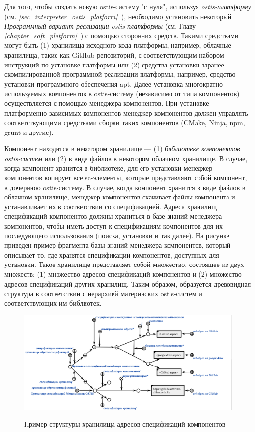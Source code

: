 Для того, чтобы создать новую ostis-систему "с нуля"{}, используя \textit{ostis-платформу} (см. \textit{\ref{sec_interpreter_ostis_platform}~}), необходимо установить некоторый \textit{Программный вариант реализации ostis-платформы} (см. Главу \textit{\ref{chapter_soft_platform}~}) с помощью сторонних средств. Такими средствами могут быть (1) хранилища исходного кода платформы, например, облачные хранилища, такие как GitHub репозиторий, с соответствующим набором инструкций по установке платформы или (2) средства установки заранее скомпилированной программной реализации платформы, например, средство установки программного обеспечения apt. Далее установка многократно используемых компонентов в ostis-систему (независимо от типа компонентов) осуществляется с помощью менеджера компонентов. При установке платформенно-зависимых компонентов менеджер компонентов должен управлять соответствующими средствами сборки таких компонентов (CMake, Ninja, npm, grunt и другие).

Компонент находится в некотором хранилище --- (1) \textit{библиотеке компонентов ostis-систем} или (2) в виде файлов в некотором облачном хранилище. В случае, когда компонент хранится в библиотеке, для его установки менеджер компонентов копирует все sc-элементы, которые представляют собой компонент, в дочернюю ostis-систему. В случае, когда компонент хранится в виде файлов в облачном хранилище, менеджер компонентов скачивает файлы компонента и устанавливает их в соответствии со спецификацией. Адреса хранилищ спецификаций компонентов должны храниться в базе знаний менеджера компонентов, чтобы иметь доступ к спецификациям компонентов для их последующего использования (поиска, установки и так далее). На рисунке \textit{} приведен пример фрагмента базы знаний менеджера компонентов, который описывает то, где хранятся спецификации компонентов, доступных для установки. Такое хранилище представляет собой множество, состоящее из двух множеств: (1) множество адресов спецификаций компонентов и (2) множество адресов спецификаций других хранилищ. Таким образом, образуется древовидная структура в соответствии с иерархией материнских ostis-систем и соответствующих им библиотек.

\begin{figure}[H]
	\caption{Пример структуры хранилища адресов спецификаций компонентов}
	\includegraphics[scale=0.5]{author/part5/figures/specification_storage_addresses.png}
	\label{fig:specification_storage_addresses}
\end{figure}

